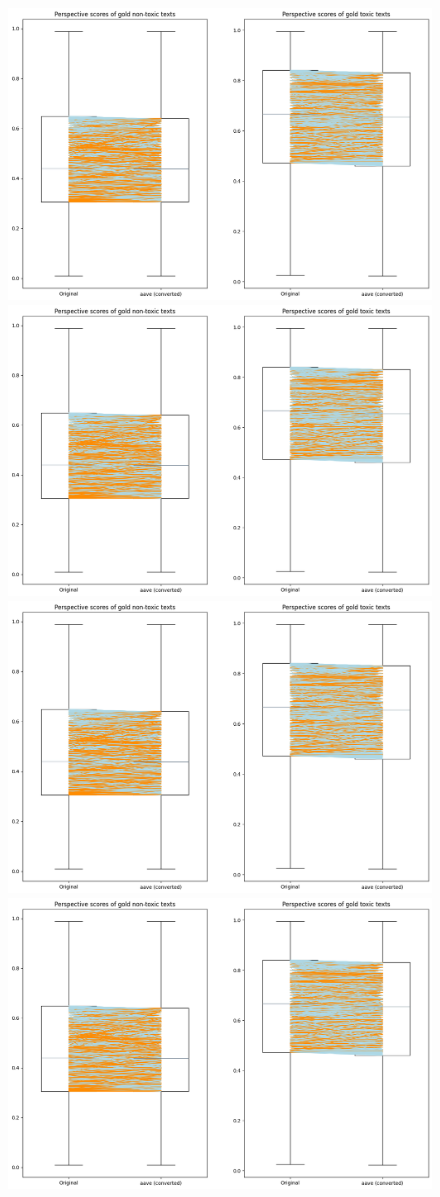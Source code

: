 \documentclass[11pt]{article}
\begin{document}
\begin{figure}[t]
  \includegraphics[width=0.48\linewidth]{figs-misc/aave-changes.png}\hfill
  \includegraphics[width=0.48\linewidth]{figs-misc/aave-changes.png}\\
  \includegraphics[width=0.48\linewidth]{figs-misc/aave-changes.png}\hfill
  \includegraphics[width=0.48\linewidth]{figs-misc/aave-changes.png}
  \caption{}
\end{figure}
\end{document}
